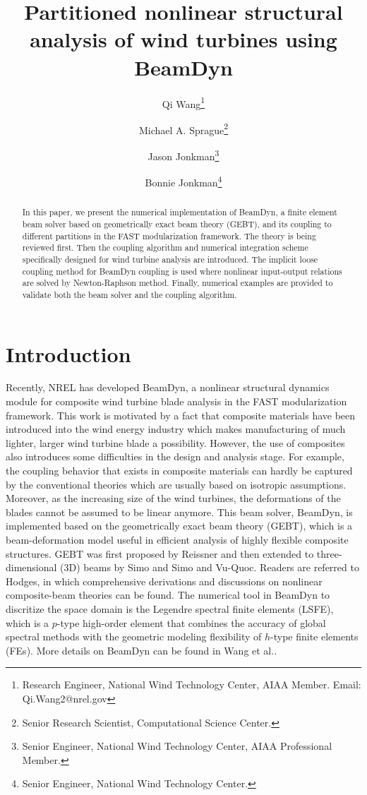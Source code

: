 \documentclass{aiaa-tc}
\title{Partitioned nonlinear structural analysis of wind turbines using BeamDyn}
\author[1]{Qi Wang\thanks{Research Engineer, National Wind Technology Center, AIAA Member. Email: Qi.Wang2@nrel.gov}}
\author[1]{Michael A. Sprague\thanks{Senior Research Scientist, 
Computational Science Center.}}
\author[1]{Jason Jonkman\thanks{Senior Engineer, National Wind Technology Center, AIAA Professional Member.}}
\author[1]{Bonnie Jonkman\thanks{Senior Engineer, National Wind Technology Center.}}
\affil[1]{National Renewable Energy Laboratory, Golden, CO 80401}
\begin{document}
\maketitle

\begin{abstract}
{In this paper, we present the numerical implementation of BeamDyn, a finite element beam solver based on geometrically exact beam theory (GEBT), and its coupling to different partitions in the FAST modularization framework. The theory is being reviewed first. Then the coupling algorithm and numerical integration scheme specifically designed for wind turbine analysis are introduced. The implicit loose coupling method for BeamDyn coupling is used where nonlinear input-output relations are solved by Newton-Raphson method. Finally, numerical examples are provided to validate both the beam solver and the coupling algorithm. }     
\end{abstract}

\section{Introduction} 
Recently, NREL has developed BeamDyn, a nonlinear structural dynamics module for composite wind turbine blade analysis in the FAST modularization framework. This work is motivated by a fact that composite materials have been introduced into the wind energy industry which makes manufacturing of much lighter, larger wind turbine blade a possibility. However, the use of composites also introduces some difficulties in the design and analysis stage. For example, the coupling behavior that exists in composite materials can hardly be captured by the conventional theories which are usually based on isotropic assumptions. Moreover, as the increasing size of the wind turbines, the deformations of the blades cannot be assumed to be linear anymore. This beam solver, BeamDyn, is implemented based on the geometrically exact beam theory (GEBT), which is a beam-deformation model useful in efficient analysis of highly flexible composite structures. GEBT was first proposed by Reissner\cite{Ressiner1973} and then extended to three-dimensional (3D) beams by Simo\cite{Simo1985} and Simo and Vu-Quoc\cite{Simo1986}. Readers are referred to
Hodges\cite{HodgesBeamBook}, in which comprehensive derivations and discussions
on nonlinear composite-beam theories can be found. The numerical tool in BeamDyn to discritize the space domain is the Legendre spectral finite elements (LSFE), which is a $p$-type high-order element that combines the accuracy of global spectral methods with the geometric modeling flexibility of $h$-type finite elements (FEs). More details on BeamDyn can be found in Wang et al.\cite{Wang:GEBT2014}.
\end{document}
